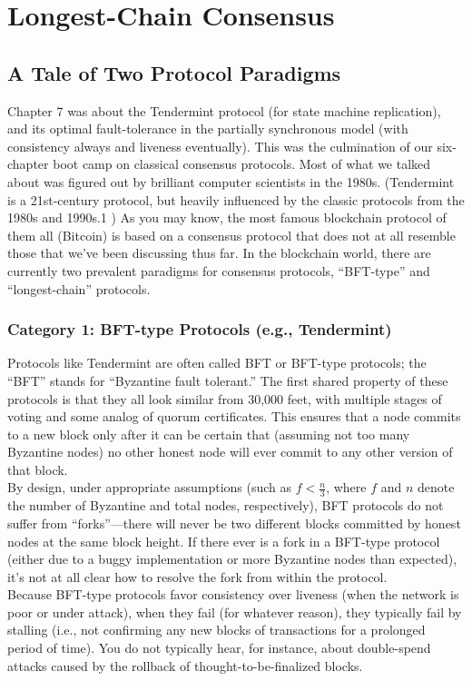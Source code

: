 \chapter{Longest-Chain Consensus}
\section{A Tale of Two Protocol Paradigms}
Chapter 7 was about the Tendermint protocol (for state machine replication), and its optimal
fault-tolerance in the partially synchronous model (with consistency always and liveness
eventually). This was the culmination of our six-chapter boot camp on classical consensus
protocols. Most of what we talked about was figured out by brilliant computer scientists
in the 1980s. (Tendermint is a 21st-century protocol, but heavily influenced by the classic protocols from the 1980s and 1990s.1
) As you may know, the most famous blockchain
protocol of them all (Bitcoin) is based on a consensus protocol that does not at all resemble
those that we've been discussing thus far. In the blockchain world, there are currently two
prevalent paradigms for consensus protocols, “BFT-type” and “longest-chain” protocols.

\subsection{Category 1: BFT-type Protocols (e.g., Tendermint)}
Protocols like Tendermint are often called BFT or BFT-type protocols; the “BFT” stands
for “Byzantine fault tolerant.” The first shared property of these protocols is that they all
look similar from 30,000 feet, with multiple stages of voting and some analog of quorum
certificates. This ensures that a node commits to a new block only after it can be certain
that (assuming not too many Byzantine nodes) no other honest node will ever commit to
any other version of that block.\\
By design, under appropriate assumptions (such as $f < \frac{n}{3}$, where $f$ and $n$ denote
the number of Byzantine and total nodes, respectively), BFT protocols do not suffer from
“forks”—there will never be two different blocks committed by honest nodes at the same
block height. If there ever is a fork in a BFT-type protocol (either due to a buggy implementation or more Byzantine nodes than expected), it’s not at all clear how to resolve the
fork from within the protocol.\\
Because BFT-type protocols favor consistency over liveness (when the network is poor
or under attack), when they fail (for whatever reason), they typically fail by stalling (i.e.,
not confirming any new blocks of transactions for a prolonged period of time). You do not
typically hear, for instance, about double-spend attacks caused by the rollback of thought-to-be-finalized blocks.
